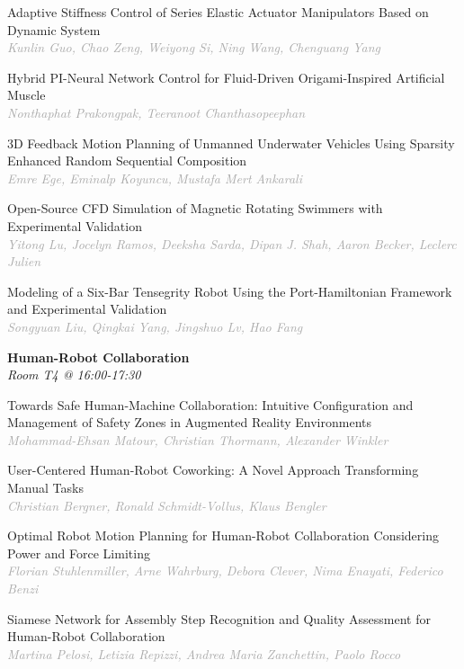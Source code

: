 \begin{multicols*}{2}
\small Adaptive Stiffness Control of Series Elastic Actuator Manipulators Based on Dynamic System\\ 
\footnotesize \textcolor{darkgray}{\textit{Kunlin Guo, Chao  Zeng, Weiyong  Si, Ning  Wang, Chenguang  Yang}}

\small Hybrid PI-Neural Network Control for Fluid-Driven Origami-Inspired Artificial Muscle\\ 
\footnotesize \textcolor{darkgray}{\textit{Nonthaphat Prakongpak, Teeranoot  Chanthasopeephan}}

\small 3D Feedback Motion Planning of Unmanned Underwater Vehicles Using Sparsity Enhanced Random Sequential Composition\\ 
\footnotesize \textcolor{darkgray}{\textit{Emre Ege, Eminalp  Koyuncu, Mustafa Mert  Ankarali}}

\small Open-Source CFD Simulation of Magnetic Rotating Swimmers with Experimental Validation\\ 
\footnotesize \textcolor{darkgray}{\textit{Yitong Lu, Jocelyn  Ramos, Deeksha  Sarda, Dipan J.  Shah, Aaron  Becker, Leclerc  Julien}}

\small Modeling of a Six-Bar Tensegrity Robot Using the Port-Hamiltonian Framework and Experimental Validation\\ 
\footnotesize \textcolor{darkgray}{\textit{Songyuan Liu, Qingkai  Yang, Jingshuo  Lv, Hao  Fang}}

\normalsize \textbf{Human-Robot Collaboration}\\
\small \textit{Room T4 @ 16:00-17:30}

\small Towards Safe Human-Machine Collaboration: Intuitive Configuration and Management of Safety Zones in Augmented Reality Environments\\ 
\footnotesize \textcolor{darkgray}{\textit{Mohammad-Ehsan Matour, Christian  Thormann, Alexander  Winkler}}

\small User-Centered Human-Robot Coworking: A Novel Approach Transforming Manual Tasks\\ 
\footnotesize \textcolor{darkgray}{\textit{Christian Bergner, Ronald  Schmidt-Vollus, Klaus  Bengler}}

\small Optimal Robot Motion Planning for Human-Robot Collaboration Considering Power and Force Limiting\\ 
\footnotesize \textcolor{darkgray}{\textit{Florian Stuhlenmiller, Arne  Wahrburg, Debora  Clever, Nima  Enayati, Federico  Benzi}}

\small Siamese Network for Assembly Step Recognition and Quality Assessment for Human-Robot Collaboration\\ 
\footnotesize \textcolor{darkgray}{\textit{Martina Pelosi, Letizia  Repizzi, Andrea Maria  Zanchettin, Paolo  Rocco}}


\end{multicols*}
